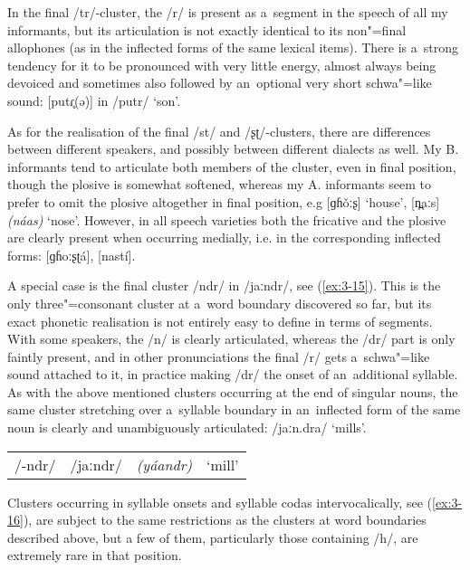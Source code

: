 In the final /tr/-cluster, the /r/ is present as a~segment in the speech of all my informants, but its articulation is not exactly identical to its non"=final allophones (as in the inflected forms of the same lexical items). There is a~strong tendency for it to be pronounced with very little energy, almost always being devoiced and sometimes also followed by an~optional very short schwa"=like sound: [putɾ̥(ə)] in /putr/ `son'. 


As for the realisation of the final /st/ and /ʂʈ/-clusters, there are differences between different speakers, and possibly between different dialects as well. My B. informants tend to articulate both members of the cluster, even in final position, though the plosive is somewhat softened, whereas my A. informants seem to prefer to omit the plosive altogether in final position, e.g [ɡɦ\v{o}ːʂ] `house', [n̪aːs] \textit{(náas)} `nose'. However, in all speech varieties both the fricative and the plosive are clearly present when occurring medially, i.e. in the corresponding inflected forms: [ɡɦoːʂʈá], [nastí].


A special case is the final cluster /ndr/ in /jaːndr/, see (\ref{ex:3-15}). This is the only three"=consonant cluster at a~word boundary discovered so far, but its exact phonetic realisation is not entirely easy to define in terms of segments. With some speakers, the /n/ is clearly articulated, whereas the /dr/ part is only faintly present, and in other pronunciations the final /r/ gets a~schwa"=like sound attached to it, in practice making /dr/ the onset of an~additional syllable. As with the above mentioned clusters occurring at the end of singular nouns, the same cluster stretching over a~syllable boundary in an~inflected form of the same noun is clearly and unambiguously articulated: /jaːn.dra/ `mills'.


\begin{exe}
\extab
\label{ex:3-15}
\begin{tabular}{ l l l l }
/-ndr/ &
/jaːndr/ &
\textit{(yáandr)} &
`mill'\\
\end{tabular}
\end{exe}


Clusters occurring in syllable onsets and syllable codas intervocalically, see (\ref{ex:3-16}), are subject to the same restrictions as the clusters at word boundaries described above, but a few of them, particularly those containing /h/, are extremely rare in that position. 



